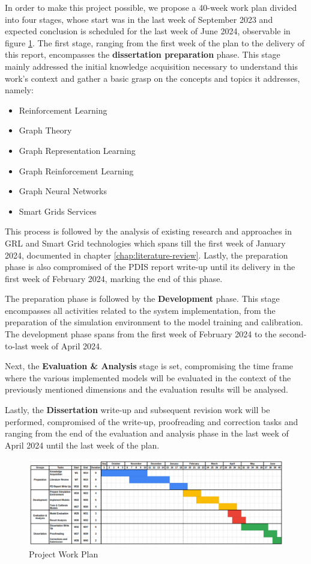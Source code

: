 In order to make this project possible, we propose a 40-week work plan divided into four stages, whose start was in the last week of September 2023 and expected conclusion is scheduled for the last week of June 2024, observable in figure \ref{fig:gantt-chart}. 
The first stage, ranging from the first week of the plan to the delivery of this report, encompasses the \textbf{dissertation preparation} phase. This stage mainly addressed the initial knowledge acquisition necessary to understand this work's context and gather a basic grasp on the concepts and topics it addresses, namely:
\begin{itemize}
	 \item Reinforcement Learning
	\item Graph Theory
	\item Graph Representation Learning
	\item Graph Reinforcement Learning
	\item Graph Neural Networks
	\item Smart Grids Services
\end{itemize}
This process is followed by the analysis of existing research and approaches in \ac{GRL} and Smart Grid technologies which spans till the first week of January 2024, documented in chapter \ref{chap:literature-review}. Lastly, the preparation phase is also compromised of the PDIS report write-up until its delivery in the first week of February 2024, marking the end of this phase. \par
The preparation phase is followed by the \textbf{Development} phase. This stage encompasses all activities related to the system implementation, from the preparation of the simulation environment to the model training and calibration. The development phase spans from the first week of February 2024 to the second-to-last week of April 2024. \par
Next, the \textbf{Evaluation \& Analysis} stage is set, compromising the time frame where the various implemented models will be evaluated in the context of the previously mentioned dimensions and the evaluation results will be analysed. \par
Lastly, the \textbf{Dissertation} write-up and subsequent revision work will be performed, compromised of the write-up, proofreading and correction tasks and ranging from the end of the evaluation and analysis phase in the last week of April 2024 until the last week of the plan.


\begin{figure}
	\includegraphics[width=1.0\linewidth]{./figures/gantt-chart.png}
	\caption{Project Work Plan}
	\label{fig:gantt-chart}
\end{figure}

